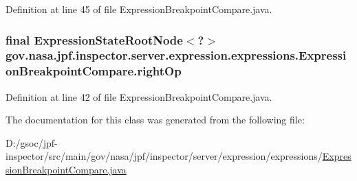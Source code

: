 Definition at line 45 of file Expression\+Breakpoint\+Compare.\+java.

\subsubsection[{\texorpdfstring{right\+Op}{rightOp}}]{\setlength{\rightskip}{0pt plus 5cm}final {\bf Expression\+State\+Root\+Node}$<$?$>$ gov.\+nasa.\+jpf.\+inspector.\+server.\+expression.\+expressions.\+Expression\+Breakpoint\+Compare.\+right\+Op\hspace{0.3cm}{\ttfamily [private]}}\hypertarget{classgov_1_1nasa_1_1jpf_1_1inspector_1_1server_1_1expression_1_1expressions_1_1_expression_breakpoint_compare_aa654f6c8084c0a74236e700b8895e9fe}{}\label{classgov_1_1nasa_1_1jpf_1_1inspector_1_1server_1_1expression_1_1expressions_1_1_expression_breakpoint_compare_aa654f6c8084c0a74236e700b8895e9fe}


Definition at line 42 of file Expression\+Breakpoint\+Compare.\+java.



The documentation for this class was generated from the following file\+:\begin{DoxyCompactItemize}
\item 
D\+:/gsoc/jpf-\/inspector/src/main/gov/nasa/jpf/inspector/server/expression/expressions/\hyperlink{_expression_breakpoint_compare_8java}{Expression\+Breakpoint\+Compare.\+java}\end{DoxyCompactItemize}
